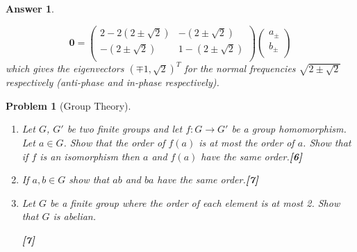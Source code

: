 \documentclass[a4paper]{article}
\newtheorem{ans}{Answer}[section]
\theoremstyle{new}
\newtheorem{qns}{Problem}[section]
\begin{document}
\begin{ans}
\begin{enumerate}[label=(\alph*)]
\begin{enumerate}[label=(\roman*)]
$$\boldsymbol{0}=\begin{pmatrix}2-2(2\pm\sqrt{2})&-(2\pm\sqrt{2})\\-(2\pm\sqrt{2})&1-(2\pm\sqrt{2})\\\end{pmatrix}\begin{pmatrix}a_\pm\\b_\pm\\\end{pmatrix}$$
which gives the eigenvectors $(\mp1,\sqrt{2})^T$ for the normal frequencies $\sqrt{2\pm\sqrt{2}}$ respectively (anti-phase and in-phase respectively).
\end{enumerate}
\end{enumerate}
\end{ans}
\newpage
\begin{qns}[Group Theory]\leavevmode
\begin{enumerate}[label=(\alph*)]
\item  Let $G$, $G'$ be two finite groups and let $f : G\rightarrow G'$ be a group homomorphism. Let $a\in G$. Show that the order of $f(a)$ is at most the order of $a$. Show that if $f$ is an isomorphism then $a$ and $f(a)$ have the same order.\hfill\textbf{[6]}
\item If $a,b\in G$ show that $ab$ and $ba$ have the same order.\hfill\textbf{[7]}
\item Let $G$ be a finite group where the order of each element is at most 2. Show that $G$ is abelian.

\hfill\textbf{[7]}
\end{enumerate}
\end{qns}
\end{document}
